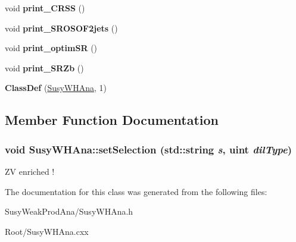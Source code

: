 \begin{DoxyCompactItemize}
\item 
\hypertarget{classSusyWHAna_a155b8f95f3d8c8ce14933129cdd58480}{
void {\bfseries print\_\-CRSS} ()}
\label{classSusyWHAna_a155b8f95f3d8c8ce14933129cdd58480}

\item 
\hypertarget{classSusyWHAna_a5289968dd681215f8f3bb9ba975bd302}{
void {\bfseries print\_\-SROSOF2jets} ()}
\label{classSusyWHAna_a5289968dd681215f8f3bb9ba975bd302}

\item 
\hypertarget{classSusyWHAna_a060c861b62071dd24b5f85fac1539b97}{
void {\bfseries print\_\-optimSR} ()}
\label{classSusyWHAna_a060c861b62071dd24b5f85fac1539b97}

\item 
\hypertarget{classSusyWHAna_a17e48f55353ffeddb37505c6848c6c27}{
void {\bfseries print\_\-SRZb} ()}
\label{classSusyWHAna_a17e48f55353ffeddb37505c6848c6c27}

\item 
\hypertarget{classSusyWHAna_a19758f57b6764595aa634edbf4849dde}{
{\bfseries ClassDef} (\hyperlink{classSusyWHAna}{SusyWHAna}, 1)}
\label{classSusyWHAna_a19758f57b6764595aa634edbf4849dde}

\end{DoxyCompactItemize}


\subsection{Member Function Documentation}
\hypertarget{classSusyWHAna_a1926975fddfbbe119c0a6915f303d2db}{
\subsubsection[{setSelection}]{\setlength{\rightskip}{0pt plus 5cm}void SusyWHAna::setSelection (std::string {\em s}, \/  uint {\em dilType})}}
\label{classSusyWHAna_a1926975fddfbbe119c0a6915f303d2db}


ZV enriched ! 

The documentation for this class was generated from the following files:\begin{DoxyCompactItemize}
\item 
SusyWeakProdAna/SusyWHAna.h\item 
Root/SusyWHAna.cxx\end{DoxyCompactItemize}
